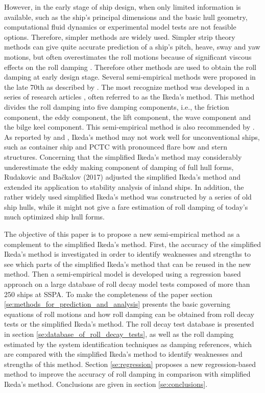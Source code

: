 However, in the early stage of ship design, when only limited information is available, such as the ship's principal dimensions and the basic hull geometry, computational fluid dynamics or experimental model tests are not feasible options.
Therefore, simpler methods are widely used. Simpler strip theory methods can give quite accurate prediction of a ship's pitch, heave, sway and yaw motions, but often overestimates the roll motions because of significant viscous effects on the roll damping \parencite{kawahara_simple_2011}. Therefore other methods are used to obtain the roll damping at early design stage. Several semi-empirical methods were proposed in the late 70th as described by  \parencite{himeno_prediction_1981}. The most recognize method was developed in a series of research articles \parencite{ikeda_roll_1978,ikeda_eddy_1978,ikeda_roll_1979,ikeda_components_1978,ikeda_velocity_1979}, often referred to as the Ikeda's method. This method divides the roll damping into five damping components, i.e., the friction component, the eddy component, the lift component, the wave component and the bilge keel component. This semi-empirical method is also recommended by \parencite{ittc_ittc_2011}. As reported by  \parencite{kawahara_simple_2011} and \parencite{soder_ikeda_2019}, Ikeda's method may not work well for unconventional ships, such as container ship and PCTC with pronounced flare bow and stern structures. Concerning that the simplified Ikeda’s
method may considerably underestimate the eddy making component
of damping of full hull forms, Rudakovic and Bačkalov (2017) adjusted the simplified Ikeda’s method and  extended its application to stability analysis of inland ships.
In addition, the rather widely used simplified Ikeda's method \parencite{kawahara_simple_2011} was constructed by a series of old ship hulls, while it might not give a fare estimation of roll damping of today's much optimized ship hull forms. 

The objective of this paper is to propose a new semi-empirical method as a complement to the simplified Ikeda's method. First, the accuracy of the simplified Ikeda's method is investigated in order to identify weaknesses and strengths to see which parts of the simplified Ikeda's method that can be reused in the new method.  
Then a semi-empirical model is developed using a regression based approach on a large database of roll decay model tests composed of more than 250 ships at SSPA.
To make the completeness of the paper section \ref{se:methods_for_prediction_and_analysis} presents the basic governing equations of roll motions and how roll damping can be obtained from roll decay tests or the simplified Ikeda's method. 
The roll decay test database is presented in section \ref{se:database_of_roll_decay_tests}, as well as the roll damping estimated by the system identification techniques as damping references, which are compared with the simplified Ikeda's method to identify weaknesses and strengths of this method. Section \ref{se:regression} proposes a new regression-based method to improve the accuracy of roll damping in comparison with simplified Ikeda's method. Conclusions are given in section \ref{se:conclusions}.  
